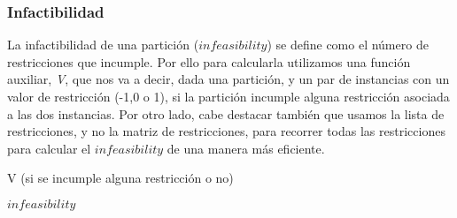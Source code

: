 \documentclass[11pt,a4paper]{article}
\begin{document}
    \subsubsection{Infactibilidad}
    La infactibilidad de una partición ($infeasibility$) se define como el número de restricciones que incumple. Por ello para calcularla utilizamos una función auxiliar, \textit{V}, que nos va a decir, dada una partición, y un par de instancias con un valor de restricción (-1,0 o 1), si la partición incumple alguna restricción asociada a las dos instancias. Por otro lado, cabe destacar también que usamos la lista de restricciones, y no la matriz de restricciones, para recorrer todas las restricciones para calcular el $infeasibility$ de una manera más eficiente.
    \begin{algorithm}
	 	\caption{V (si se incumple alguna restricción o no)}
	\end{algorithm}
	\begin{algorithm}
	 	\caption{$infeasibility$}
	\end{algorithm}
\end{document}
